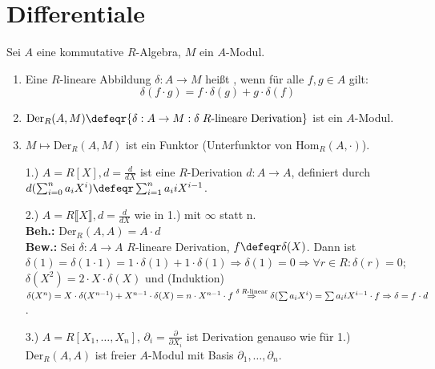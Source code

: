 \section{Differentiale}

\begin{DefBem}
  Sei $A$ eine kommutative $R$-Algebra, $M$ ein $A$-Modul.

  \begin{enumerate}
    \item Eine $R$-lineare Abbildung $\delta: A \to M$ heißt
          , wenn für alle $f,g \in A$ gilt:
          \[\delta(f \cdot g) = f \cdot \delta(g) + g \cdot \delta(f)\]
    \item $\mbox{Der}_R(A,M) \defeqr \{ \delta: A \to M: \delta \;
          R\mbox{-lineare Derivation}\}$ ist ein $A$-Modul.
    \item $M \mapsto \mbox{Der}_R(A,M)$ ist ein Funktor (Unterfunktor von $\mbox{Hom}_R(A,\cdot)$).
  \end{enumerate}
\end{DefBem}

\begin{nnBsp}
  \begin{enumerate}
    \item[1.)] $A = R[X], d = \frac{d}{dX}$ ist eine $R$-Derivation $d: A \to
               A$, definiert durch $d(\sum_{i=0}^n a_i X^i) \defeqr \sum_{i=1}^n a_i
               i X^{i-1}$.
    \item[2.)] $A = R \llbracket X \rrbracket, d = \frac{d}{dX}$ wie in 1.) mit
               $\infty$ statt n.\\
               \textbf{Beh.:} $\mbox{Der}_R(A,A) = A \cdot d$\\
               \textbf{Bew.:} Sei $\delta: A \to A$ $R$-lineare Derivation, $f
               \defeqr \delta(X)$. Dann ist $\delta(1) = \delta(1 \cdot 1) =1 
               \cdot \delta(1) + 1 \cdot \delta(1) \Rightarrow \delta(1) = 0
               \Rightarrow \forall r \in R:\delta(r) = 0$; $\delta(X^2) = 2
               \cdot X \cdot \delta(X)$ und (Induktion) $\delta(X^n) = X \cdot
               \delta(X^{n-1}) + X^{n-1} \cdot \delta(X) = n \cdot X^{n-1}\cdot
               f \overset{\delta\; R\mbox{\scriptsize -linear}}{\Rightarrow}
               \delta(\sum a_i X^i) = \sum a_i i X^{i-1} \cdot f \Rightarrow
               \delta = f \cdot d$.
    \item[3.)] $A = R[X_1,\dots,X_n]$, $\partial_i = \frac{\partial}{\partial
               X_i}$ ist Derivation genauso wie für 1.)\\
               $\mbox{Der}_R(A,A)$ ist freier $A$-Modul mit Basis $\partial_1,
               \dots , \partial_n$.
  \end{enumerate}
\end{nnBsp}

